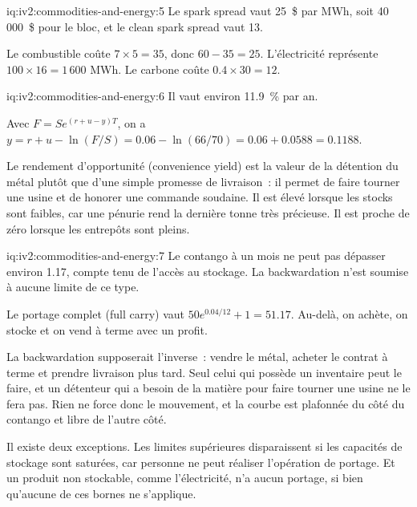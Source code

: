 \begin{solution}{iq:iv2:commodities-and-energy:5}
Le spark spread vaut 25~\$ par MWh, soit 40\,000~\$ pour le bloc, et le clean spark spread vaut 13.

Le combustible coûte $7 \times 5 = 35$, donc $60 - 35 = 25$. L'électricité représente $100 \times 16 = 1\,600$ MWh. Le carbone coûte $0.4 \times 30 = 12$.

\end{solution}

\begin{solution}{iq:iv2:commodities-and-energy:6}
Il vaut environ 11.9~\% par an.

Avec $F = S e^{(r + u - y)T}$, on a $y = r + u - \ln(F/S) = 0.06 - \ln(66/70) = 0.06 + 0.0588 = 0.1188$.

Le rendement d'opportunité (convenience yield) est la valeur de la détention du métal plutôt que d'une simple promesse de livraison~: il permet de faire tourner une usine et de honorer une commande soudaine. Il est élevé lorsque les stocks sont faibles, car une pénurie rend la dernière tonne très précieuse. Il est proche de zéro lorsque les entrepôts sont pleins.

\end{solution}

\begin{solution}{iq:iv2:commodities-and-energy:7}
Le contango à un mois ne peut pas dépasser environ 1.17, compte tenu de l'accès au stockage. La backwardation n'est soumise à aucune limite de ce type.

Le portage complet (full carry) vaut $50e^{0.04/12} + 1 = 51.17$. Au-delà, on achète, on stocke et on vend à terme avec un profit.

La backwardation supposerait l'inverse~: vendre le métal, acheter le contrat à terme et prendre livraison plus tard. Seul celui qui possède un inventaire peut le faire, et un détenteur qui a besoin de la matière pour faire tourner une usine ne le fera pas. Rien ne force donc le mouvement, et la courbe est plafonnée du côté du contango et libre de l'autre côté.

Il existe deux exceptions. Les limites supérieures disparaissent si les capacités de stockage sont saturées, car personne ne peut réaliser l'opération de portage. Et un produit non stockable, comme l'électricité, n'a aucun portage, si bien qu'aucune de ces bornes ne s'applique.

\end{solution}

